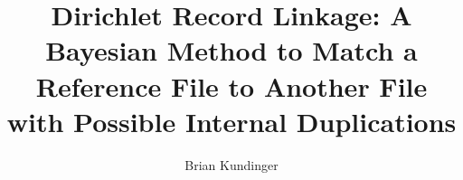 \documentclass[12pt,letterpaper]{article}
\title{Dirichlet Record Linkage: A Bayesian Method to Match a Reference File to Another File with Possible Internal Duplications}
\author{Brian Kundinger}
\newcommand{\1}[1]{\mathbb{I}\!\left[#1\right]} %
\def\spacingset#1{\renewcommand{\baselinestretch}%
  {#1}\small\normalsize} \spacingset{1}
\begin{document}
%
%
\spacingset{1.5}


\end{document}
